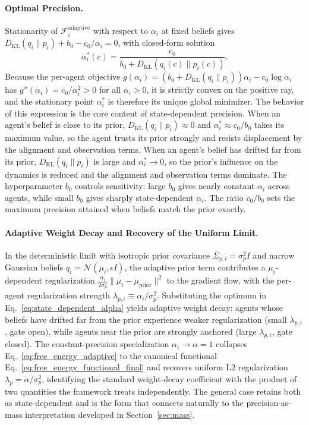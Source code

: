 \documentclass[11pt]{article}
\begin{document}
\paragraph{Optimal Precision.}
Stationarity of $\mathcal{F}_i^{\mathrm{adaptive}}$ with respect to $\alpha_i$ at fixed beliefs gives $D_{\mathrm{KL}}(q_i\|p_i) + b_0 - c_0/\alpha_i = 0$, with closed-form solution
\begin{equation}
\boxed{
\alpha_i^*(c) = \frac{c_0}{b_0 + D_{\mathrm{KL}}(q_i(c)\|p_i(c))}.
}
\label{eq:state_dependent_alpha}
\end{equation}
Because the per-agent objective $g(\alpha_i) = (b_0 + D_{\mathrm{KL}}(q_i\|p_i))\alpha_i - c_0\log\alpha_i$ has $g''(\alpha_i) = c_0/\alpha_i^2 > 0$ for all $\alpha_i > 0$, it is strictly convex on the positive ray, and the stationary point $\alpha_i^*$ is therefore its unique global minimizer.
The behavior of this expression is the core content of state-dependent precision. When an agent's belief is close to its prior, $D_{\mathrm{KL}}(q_i\|p_i) \approx 0$ and $\alpha_i^* \approx c_0/b_0$ takes its maximum value, so the agent trusts its prior strongly and resists displacement by the alignment and observation terms. When an agent's belief has drifted far from its prior, $D_{\mathrm{KL}}(q_i\|p_i)$ is large and $\alpha_i^* \to 0$, so the prior's influence on the dynamics is reduced and the alignment and observation terms dominate. The hyperparameter $b_0$ controls sensitivity: large $b_0$ gives nearly constant $\alpha_i$ across agents, while small $b_0$ gives sharply state-dependent $\alpha_i$. The ratio $c_0/b_0$ sets the maximum precision attained when beliefs match the prior exactly.

\paragraph{Adaptive Weight Decay and Recovery of the Uniform Limit.}
In the deterministic limit with isotropic prior covariance $\bar\Sigma_{p,i} = \sigma_p^2 I$ and narrow Gaussian beliefs $q_i = \mathcal{N}(\mu_i, \epsilon I)$, the adaptive prior term contributes a $\mu_i$-dependent regularization $\frac{\alpha_i}{2\sigma_p^2}\|\mu_i - \mu_{\mathrm{prior}}\|^2$ to the gradient flow, with the per-agent regularization strength $\lambda_{p,i} \equiv \alpha_i/\sigma_p^2$. Substituting the optimum in Eq.~\eqref{eq:state_dependent_alpha} yields adaptive weight decay: agents whose beliefs have drifted far from the prior experience weaker regularization (small $\lambda_{p,i}$, gate open), while agents near the prior are strongly anchored (large $\lambda_{p,i}$, gate closed). The constant-precision specialization $\alpha_i \to \alpha = 1$ collapses Eq.~\eqref{eq:free_energy_adaptive} to the canonical functional Eq.~\eqref{eq:free_energy_functional_final} and recovers uniform L2 regularization $\lambda_p = \alpha/\sigma_p^2$, identifying the standard weight-decay coefficient with the product of two quantities the framework treats independently. The general case retains both as state-dependent and is the form that connects naturally to the precision-as-mass interpretation developed in Section~\ref{sec:mass}.
\end{document}
